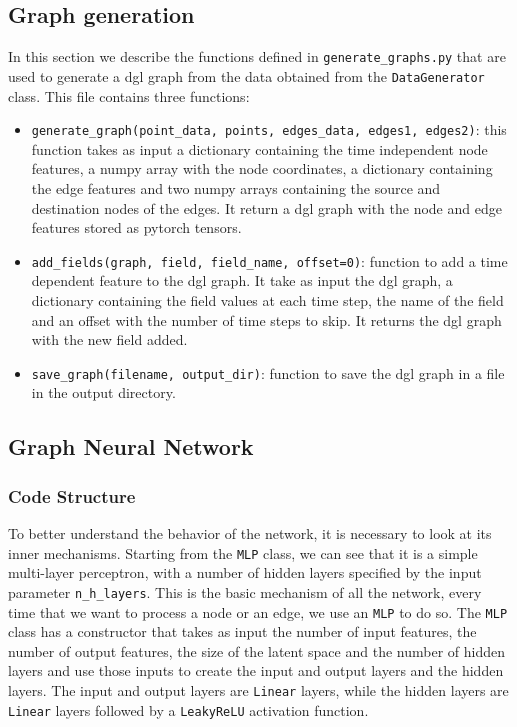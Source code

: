 \documentclass[11pt,a4paper]{article}
\begin{document}
\subsection{Graph generation}
In this section we describe the functions defined in \texttt{generate\_graphs.py} that are used to generate a dgl graph from the data obtained from the \texttt{DataGenerator} class. This file contains three functions: 
\begin{itemize}
    \item \texttt{generate\_graph(point\_data, points, edges\_data, edges1, edges2)}: this function takes as input a dictionary containing the time independent node features, a numpy array with the node coordinates, a dictionary containing the edge features and two numpy arrays containing the source and destination nodes of the edges. It return a dgl graph with the node and edge features stored as pytorch tensors.
    \item \texttt{add\_fields(graph, field, field\_name, offset=0)}: function to add a time dependent feature to the dgl graph. It take as input the dgl graph, a dictionary containing the field values at each time step, the name of the field and an offset with the number of time steps to skip. It returns the dgl graph with the new field added.
    \item \texttt{save\_graph(filename, output\_dir)}: function to save the dgl graph in a file in the output directory.
\end{itemize}

\subsection{Graph Neural Network}
\label{gnn}


\subsubsection*{Code Structure}
To better understand the behavior of the network, it is necessary to look at its inner mechanisms. 
Starting from the \texttt{MLP} class, we can see that it is a simple multi-layer perceptron, with a number of hidden layers specified by the input parameter \texttt{n\_h\_layers}. This is the basic mechanism of all the network, every time that we want to process a node or an edge, we use an \texttt{MLP} to do so. 
The \texttt{MLP} class has a constructor that takes as input the number of input features, the number of output features, the size of the latent space and the number of hidden layers and use those inputs to create the input and output layers and the hidden layers. The input and output layers are \texttt{Linear} layers, while the hidden layers are \texttt{Linear} layers followed by a \texttt{LeakyReLU} activation function. 
\end{document}
